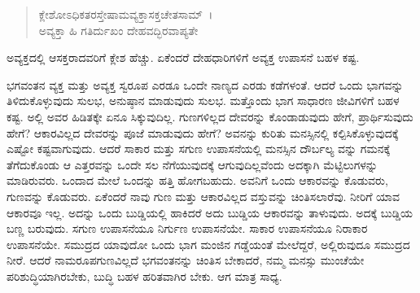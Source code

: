 \begin{verse}
ಕ್ಲೇಶೋಽಧಿಕತರಸ್ತೇಷಾಮವ್ಯಕ್ತಾಸಕ್ತಚೇತಸಾಮ್~।\\ಅವ್ಯಕ್ತಾ ಹಿ ಗತಿರ್ದುಖಂ ದೇಹವದ್ಭಿರವಾಪ್ಯತೇ 
\end{verse}

{\small ಅವ್ಯಕ್ತದಲ್ಲಿ ಆಸಕ್ತರಾದವರಿಗೆ ಕ್ಲೇಶ ಹೆಚ್ಚು. ಏಕೆಂದರೆ ದೇಹಧಾರಿಗಳಿಗೆ ಅವ್ಯಕ್ತ ಉಪಾಸನೆ ಬಹಳ ಕಷ್ಟ.}

ಭಗವಂತನ ವ್ಯಕ್ತ ಮತ್ತು ಅವ್ಯಕ್ತ ಸ್ವರೂಪ ಎರಡೂ ಒಂದೇ ನಾಣ್ಯದ ಎರಡು ಕಡೆಗಳಂತೆ. ಆದರೆ ಒಂದು ಭಾಗವನ್ನು ತಿಳಿದುಕೊಳ್ಳುವುದು ಸುಲಭ, ಅನುಷ್ಠಾನ ಮಾಡುವುದು ಸುಲಭ. ಮತ್ತೊಂದು ಭಾಗ ಸಾಧಾರಣ ಜೀವಿಗಳಿಗೆ ಬಹಳ ಕಷ್ಟ. ಅಲ್ಲಿ ಅವರ ಹಿಡಿತಕ್ಕೇ ಏನೂ ಸಿಕ್ಕುವುದಿಲ್ಲ. ಗುಣಗಳಿಲ್ಲದ ದೇವರನ್ನು ಕೊಂಡಾಡುವುದು ಹೇಗೆ, ಪ್ರಾರ್ಥಿಸುವುದು ಹೇಗೆ? ಆಕಾರವಿಲ್ಲದ ದೇವರನ್ನು ಪೂಜೆ ಮಾಡುವುದು ಹೇಗೆ? ಅವನನ್ನು ಕುರಿತು ಮನಸ್ಸಿನಲ್ಲಿ ಕಲ್ಪಿಸಿಕೊಳ್ಳುವುದಕ್ಕೆ ಎಷ್ಟೋ ಕಷ್ಟವಾಗುವುದು. ಆದರೆ ಸಾಕಾರ ಮತ್ತು ಸಗುಣ ಉಪಾಸನೆಯಲ್ಲಿ ಮನಸ್ಸಿನ ದೌರ್ಬಲ್ಯ ವನ್ನು ಗಮನಕ್ಕೆ ತೆಗೆದುಕೊಂಡು ಆ ಎತ್ತರವನ್ನು ಒಂದೇ ಸಲ ನೆಗೆಯುವುದಕ್ಕೆ ಆಗುವುದಿಲ್ಲವೆಂದು ಅದಕ್ಕಾಗಿ ಮೆಟ್ಟಿಲುಗಳನ್ನು ಮಾಡಿರುವರು. ಒಂದಾದ ಮೇಲೆ ಒಂದನ್ನು ಹತ್ತಿ ಹೋಗಬಹುದು. ಅವನಿಗೆ ಒಂದು ಆಕಾರವನ್ನು ಕೊಡುವರು, ಗುಣವನ್ನು ಕೊಡುವರು. ಏಕೆಂದರೆ ನಾವು ಗುಣ ಮತ್ತು ಆಕಾರವಿಲ್ಲದ ವಸ್ತುವನ್ನು ಚಿಂತಿಸಲಾರೆವು. ನೀರಿಗೆ ಯಾವ ಆಕಾರವೂ ಇಲ್ಲ. ಅದನ್ನು ಒಂದು ಬುಡ್ಡಿಯಲ್ಲಿ ಹಾಕಿದರೆ ಅದು ಬುಡ್ಡಿಯ ಆಕಾರವನ್ನು ತಾಳುವುದು. ಅದಕ್ಕೆ ಬುಡ್ಡಿಯ ಬಣ್ಣ ಬರುವುದು. ಸಗುಣ ಉಪಾಸನೆಯೂ ನಿರ್ಗುಣ ಉಪಾಸನೆಯೇ. ಸಾಕಾರ ಉಪಾಸನೆಯೂ ನಿರಾಕಾರ ಉಪಾಸನೆಯೇ. ಸಮುದ್ರದ ಯಾವುದೋ ಒಂದು ಭಾಗ ಮಂಜಿನ ಗಡ್ಡೆಯಂತೆ ಮೇಲೆದ್ದರೆ, ಅಲ್ಲಿರುವುದೂ ಸಮುದ್ರದ ನೀರೆ. ಆದರೆ ನಾಮರೂಪಗುಣವಿಲ್ಲದೆ ಭಗವಂತನನ್ನು ಚಿಂತಿಸ ಬೇಕಾದರೆ, ನಮ್ಮ ಮನಸ್ಸು ಮುಂಚೆಯೇ ಪರಿಶುದ್ಧಿಯಾಗಿರಬೇಕು, ಬುದ್ಧಿ ಬಹಳ ಹರಿತವಾಗಿರ ಬೇಕು. ಆಗ ಮಾತ್ರ ಸಾಧ್ಯ.

